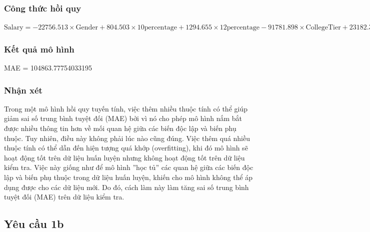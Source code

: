 \documentclass[]{article}
\begin{document}
\subsubsection{Công thức hồi quy}
$\text{Salary} = -22756.513 \times \text{Gender} + 804.503 \times \text{10percentage} + 1294.655 \times \text{12percentage} -91781.898 \times \text{CollegeTier} + 23182.389 \times \text{Degree} + 1437.549 \times \text{collegeGPA} -8570.662 \times \text{CollegeCityTier} + 147.858 \times \text{English} + 152.888 \times \text{Logical} + 117.222 \times \text{Quant} + 34552.286 \times \text{Domain}$

\subsubsection{Kết quả mô hình}
MAE = 104863.77754033195

\subsubsection{Nhận xét}
Trong một mô hình hồi quy tuyến tính, việc thêm nhiều thuộc tính có thể giúp giảm sai số trung bình tuyệt đối (MAE) bởi vì nó cho phép mô hình nắm bắt được nhiều thông tin hơn về mối quan hệ giữa các biến độc lập và biến phụ thuộc. Tuy nhiên, điều này không phải lúc nào cũng đúng. Việc thêm quá nhiều thuộc tính có thể dẫn đến hiện tượng quá khớp (overfitting), khi đó mô hình sẽ hoạt động tốt trên dữ liệu huấn luyện nhưng không hoạt động tốt trên dữ liệu kiểm tra. Việc này giống như để mô hình ''học tủ'' các quan hệ giữa các biến độc lập và biến phụ thuộc trong dữ liệu huấn luyện, khiến cho mô hình không thể áp dụng được cho các dữ liệu mới. Do đó, cách làm này làm tăng sai số trung bình tuyệt đối (MAE) trên dữ liệu kiểm tra.

\subsection{Yêu cầu 1b}
\end{document}
